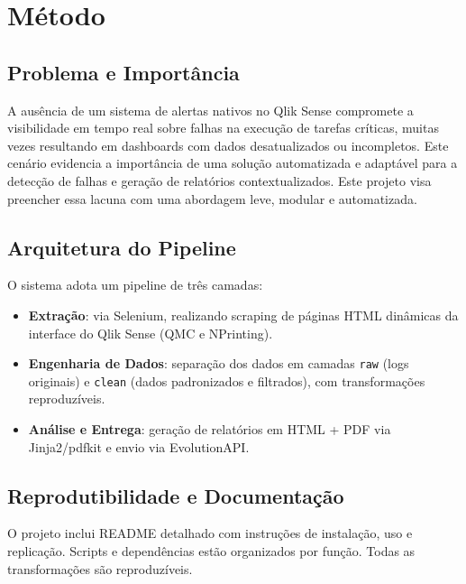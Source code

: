 \documentclass[conference]{IEEEtran}
\begin{document}
\section{Método}
\subsection{Problema e Importância}
A ausência de um sistema de alertas nativos no Qlik Sense compromete a visibilidade em tempo real sobre falhas na execução de tarefas críticas, muitas vezes resultando em dashboards com dados desatualizados ou incompletos. Este cenário evidencia a importância de uma solução automatizada e adaptável para a detecção de falhas e geração de relatórios contextualizados.
Este projeto visa preencher essa lacuna com uma abordagem leve, modular e automatizada.

\subsection{Arquitetura do Pipeline}
O sistema adota um pipeline de três camadas:
\begin{itemize}
  \item \textbf{Extração}: via Selenium, realizando scraping de páginas HTML dinâmicas da interface do Qlik Sense (QMC e NPrinting).
  \item \textbf{Engenharia de Dados}: separação dos dados em camadas \texttt{raw} (logs originais) e \texttt{clean} (dados padronizados e filtrados), com transformações reproduzíveis.
  \item \textbf{Análise e Entrega}: geração de relatórios em HTML + PDF via Jinja2/pdfkit e envio via EvolutionAPI.
\end{itemize}

\subsection{Reprodutibilidade e Documentação}
O projeto inclui README detalhado com instruções de instalação, uso e replicação. Scripts e dependências estão organizados por função. Todas as transformações são reproduzíveis.
\end{document}
